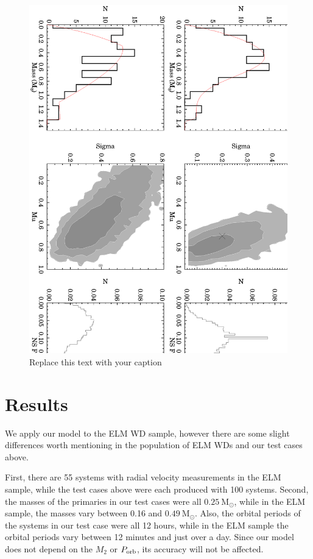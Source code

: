 \documentclass[letterpaper,12pt,preprint]{aastex}
\newcommand{\Msun}{\mathrm{M}_\odot}
\begin{document}
\begin{figure}[h!]
\begin{center}
\includegraphics[angle=90,width=1\columnwidth]{model_post.eps}
\caption{Replace this text with your caption}
\end{center}
\end{figure}

\section{Results}

We apply our model to the ELM WD sample, however there are some slight differences worth mentioning in the population of ELM WDs and our test cases above. 

First, there are 55 systems with radial velocity measurements in the ELM sample, while the test cases above were each produced with 100 systems. Second, the masses of the primaries in our test cases were all $0.25~\Msun$, while in the ELM sample, the masses vary between 0.16 and $0.49~\Msun$. Also, the orbital periods of the systems in our test case were all 12 hours, while in the ELM sample the orbital periods vary between 12 minutes and just over a day. Since our model does not depend on the $M_2$ or $P_{\rm orb}$, its accuracy will not be affected. 
\end{document}
